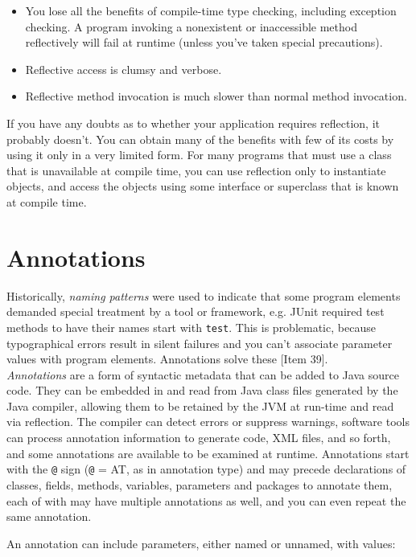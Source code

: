 \documentclass[table, xcdraw]{article}%
\begin{document}
\begin{itemize}
    \item You lose all the benefits of compile-time type checking, including exception checking. A program invoking a nonexistent or inaccessible method reflectively will fail at runtime (unless you’ve taken special precautions).
    \item Reflective access is clumsy and verbose.
    \item Reflective method invocation is much slower than normal method invocation.
\end{itemize}

If you have any doubts as to whether your application requires reflection, it probably doesn’t. You can obtain many of the benefits with few of its costs by using it only in a very limited form. For many programs that must use a class that is unavailable at compile time, you can use reflection only to instantiate objects, and access the objects using some interface or superclass that is known at compile time.

\section{Annotations}

Historically, \emph{naming patterns} were used to indicate that some program
elements demanded special treatment by a tool or framework, e.g. JUnit required test methods to have their names start with \texttt{test}. This is problematic, because typographical errors result in silent failures and you can't associate parameter values with program elements. Annotations solve these [Item 39].\\
\emph{Annotations} are a form of syntactic metadata that can be added to Java source code. They can be embedded in and read from Java class files generated by the Java compiler, allowing them to be retained by the JVM at run-time and read via reflection. The compiler can detect errors or suppress warnings, software tools can process annotation information to generate code, XML files, and so forth, and some annotations are available to be examined at runtime. Annotations start with the \texttt{@} sign (\texttt{@} = AT, as in annotation type) and may precede declarations of classes, fields, methods, variables, parameters and packages to annotate them, each of with may have multiple annotations as well, and you can even repeat the same annotation.

An annotation can include parameters, either named or unnamed, with values:
\end{document}
